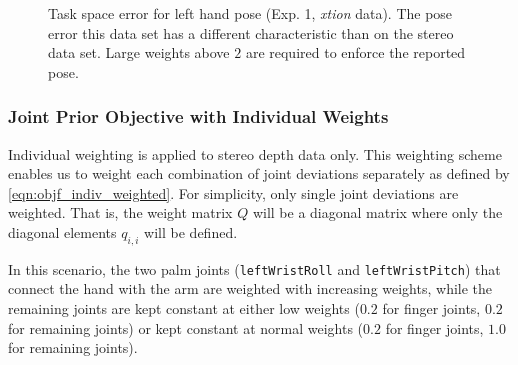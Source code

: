 \begin{figure}[h]
\centering
{}
%
\caption{Task space error for left hand pose (Exp. 1, \textit{xtion} data). The pose error this data set has a different characteristic than on the stereo data set. Large weights above $2$ are required to enforce the reported pose.}
\label{fig:xtion_hand_pose_error}
\end{figure}

\subsubsection{Joint Prior Objective with Individual Weights}

Individual weighting is applied to stereo depth data only. This weighting scheme enables us to weight each combination of joint deviations separately as defined by \cref{eqn:objf_indiv_weighted}. For simplicity, only single joint deviations are weighted. That is, the weight matrix $Q$ will be a diagonal matrix where only the diagonal elements $q_{i,i}$ will be defined.

In this scenario, the two palm joints (\texttt{leftWristRoll} and \texttt{leftWristPitch}) that connect the hand with the arm are weighted with increasing weights, while the remaining joints are kept constant at either low weights ($0.2$ for finger joints, $0.2$ for remaining joints) or kept constant at normal weights ($0.2$ for finger joints, $1.0$ for remaining joints).

